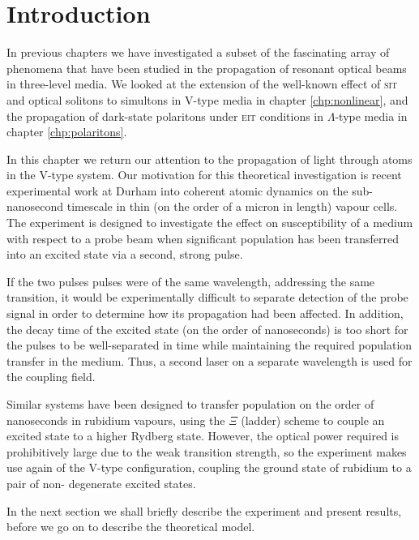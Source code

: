\section{Introduction}
  \label{sec:simultons_intro}

    In previous chapters we have investigated a subset of the fascinating array
    of phenomena that have been studied in the propagation of resonant optical
    beams in three-level media. We looked at the extension of the well-known
    effect of \textsc{sit} and optical solitons to simultons in V-type media in
    chapter \ref{chp:nonlinear}, and the propagation of dark-state polaritons
    under \textsc{eit} conditions in $\Lambda$-type media in chapter
    \ref{chp:polaritons}.


    In this chapter we return our attention to the propagation of light through
    atoms in the V-type system. Our motivation for this theoretical
    investigation is recent experimental work at Durham into coherent atomic
    dynamics on the sub-nanosecond timescale in thin (on the order of a micron
    in length) vapour cells.\cite{Keaveney2013} The experiment is designed to
    investigate the effect on susceptibility of a medium with respect to a probe
    beam when significant population has been transferred into an excited state
    via a second, strong pulse.

    If the two pulses pulses were of the same wavelength, addressing the same
    transition, it would be experimentally difficult to separate detection of
    the probe signal in order to determine how its propagation had been
    affected. In addition, the decay time of the excited state (on the order of
    nanoseconds) is too short for the pulses to be well-separated in time while
    maintaining the required population transfer in the medium. Thus, a second
    laser on a separate wavelength is used for the coupling field.

    Similar systems have been designed to transfer population on the order of
    nanoseconds in rubidium vapours, using the $\Xi$ (ladder) scheme to couple an
    excited state to a higher Rydberg state.\cite{Huber2011,Baluktsian2013}
    However, the optical power required is prohibitively large due to the weak
    transition strength, so the experiment makes use again of the V-type
    configuration, coupling the ground state of rubidium to a pair of non-
    degenerate excited states.

    In the next section we shall briefly describe the experiment and present
    results, before we go on to describe the theoretical model.
